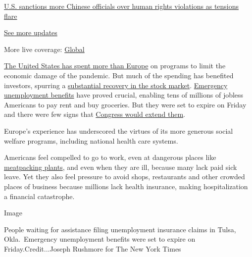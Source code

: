 \href{https://www.nytimes.com/live/2020/07/31/business/stock-market-today-coronavirus?action=click\&pgtype=Article\&state=default\&region=MAIN_CONTENT_1\&context=storylines_live_updates\#us-sanctions-more-chinese-officials-over-human-rights-violations-as-tensions-flare}{U.S.
sanctions more Chinese officials over human rights violations as
tensions flare}

\href{https://www.nytimes.com/live/2020/07/31/business/stock-market-today-coronavirus?action=click\&pgtype=Article\&state=default\&region=MAIN_CONTENT_1\&context=storylines_live_updates}{See
more updates}

More live coverage:
\href{https://www.nytimes.com/2020/08/01/world/coronavirus-covid-19.html?action=click\&pgtype=Article\&state=default\&region=MAIN_CONTENT_1\&context=storylines_live_updates}{Global}

\href{https://www.bruegel.org/publications/datasets/covid-national-dataset/}{The
United States has spent more than Europe} on programs to limit the
economic damage of the pandemic. But much of the spending has benefited
investors, spurring a
\href{https://www.nytimes.com/2020/06/08/business/recession-stock-market-coronavirus.html}{substantial
recovery in the stock market}.
\href{https://www.nytimes.com/2020/07/29/business/economy/unemployment-benefits-coronavirus.html}{Emergency
unemployment benefits} have proved crucial, enabling tens of millions of
jobless Americans to pay rent and buy groceries. But they were set to
expire on Friday and there were few signs that
\href{https://www.nytimes.com/2020/07/30/us/politics/senate-virus-aid.html}{Congress
would extend them}.

Europe's experience has underscored the virtues of its more generous
social welfare programs, including national health care systems.

Americans feel compelled to go to work, even at dangerous places like
\href{https://www.nytimes.com/2020/05/10/business/economy/coronavirus-tyson-plant-iowa.html}{meatpacking
plants}, and even when they are ill, because many lack paid sick leave.
Yet they also feel pressure to avoid shops, restaurants and other
crowded places of business because millions lack health insurance,
making hospitalization a financial catastrophe.

Image

People waiting for assistance filing unemployment insurance claims in
Tulsa, Okla.~Emergency unemployment benefits were set to expire on
Friday.Credit...Joseph Rushmore for The New York Times

